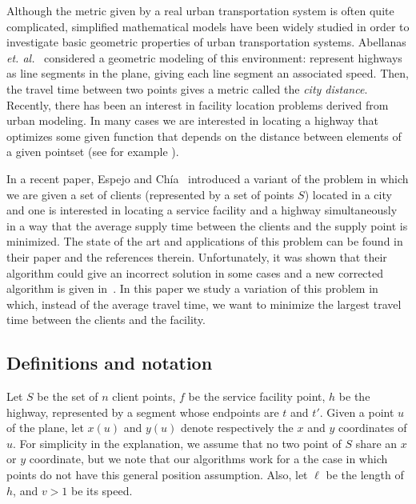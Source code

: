\documentclass{llncs}
\newcommand{\x}[1]{x({#1})}
\newcommand{\y}[1]{y({#1})}
\begin{document}
Although the metric given by a real urban transportation system is often quite complicated, simplified mathematical models have been widely studied in order to investigate basic geometric properties of urban transportation systems. Abellanas {\em et. al.}~\cite{ahiklmps-vdsnh-03} considered a geometric modeling of this environment: represent highways as line segments in the plane, giving each line segment an associated speed. Then, the travel time between two points gives a metric called the {\em city distance}. Recently, there has been an interest in facility location problems derived from urban modeling. In many cases we are interested in locating a highway that optimizes some given function that depends on the distance between elements of a given pointset (see for example \cite{cardinal08,kt-oishcm-08}).

In a recent paper,  Espejo and Ch\'{i}a~\cite{espejo11} introduced a variant of the problem in which we are given a set of clients  (represented by a set of points $S$) located in a city and one is interested in locating a  service facility and a highway simultaneously in a way that the average supply time between the clients and the supply point is minimized.
The state of the art and applications of this problem can be found in their paper and the references therein.
Unfortunately, it was shown that their algorithm could give an incorrect solution in some cases and a new corrected algorithm is given in~\cite{bklv-lsfrtl-11}. In this paper we study a variation of this problem in which, instead of the average travel time, we want to minimize the largest travel time between the clients and the facility.







\subsection{Definitions and notation}
Let $S$ be the set of $n$ client points, $f$ be the service facility point, $h$ be the highway, represented by a segment whose endpoints are $t$ and $t'$. Given a point $u$ of the plane, let $\x{u}$ and $\y{u}$ denote respectively the $x$ and $y$ coordinates of $u$. For simplicity in the explanation, we assume that no two point of $S$ share an $x$ or $y$ coordinate, but we note that our algorithms work for a the case in which points do not have this general position assumption.  Also, let $\ell$ be the length of $h$, and $v>1$ be its speed. 
\end{document}
